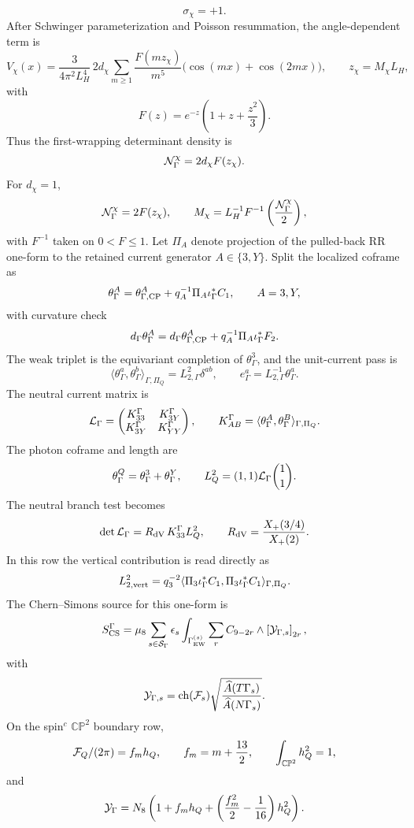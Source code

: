 \documentclass[11pt]{article}
\theoremstyle{definition}
\theoremstyle{remark}
\newcommand{\CP}{\mathbb{CP}}
\newcommand{\Xp}{X_+}
\begin{document}
\[
  \sigma_\chi=+1.
\]
After Schwinger parameterization and Poisson resummation, the
angle-dependent term is
\[
  V_\chi(x)
  =
  \frac{3}{4\pi^2L_H^4}\,2d_\chi
  \sum_{m\ge1}
  \frac{F(mz_\chi)}{m^5}
  \bigl(\cos(mx)+\cos(2mx)\bigr),
  \qquad
  z_\chi=M_\chi L_H ,
\]
with
\[
  F(z)=e^{-z}\left(1+z+\frac{z^2}{3}\right).
\]
Thus the first-wrapping determinant density is
\[
  {\cal N}_\Gamma^\chi=2d_\chi F(z_\chi).
\]
For \(d_\chi=1\),
\[
  {\cal N}_\Gamma^\chi=2F(z_\chi),
  \qquad
  M_\chi=L_H^{-1}F^{-1}
  \left(\frac{{\cal N}_\Gamma^\chi}{2}\right),
\]
with \(F^{-1}\) taken on \(0<F\le1\).
Let \(\Pi_A\) denote projection of the pulled-back RR one-form to the retained
current generator \(A\in\{3,Y\}\).  Split the localized coframe as
\[
  \theta_\Gamma^A
  =
  \theta_{\Gamma,{\rm CP}}^A
  +
  q_A^{-1}\Pi_A\iota_\Gamma^*C_1,
  \qquad A=3,Y,
\]
with curvature check
\[
  d_\Gamma\theta_\Gamma^A
  =
  d_\Gamma\theta_{\Gamma,{\rm CP}}^A
  +
  q_A^{-1}\Pi_A\iota_\Gamma^*F_2 .
\]
The weak triplet is the equivariant completion of \(\theta_\Gamma^3\), and
the unit-current pass is
\[
  \langle\theta_\Gamma^a,\theta_\Gamma^b\rangle_{\Gamma,\Pi_Q}
  =
  L_{2,\Gamma}^2\delta^{ab},
  \qquad
  e_\Gamma^a=L_{2,\Gamma}^{-1}\theta_\Gamma^a .
\]
The neutral current matrix is
\[
  {\cal L}_\Gamma
  =
  \begin{pmatrix}
  K_{33}^\Gamma&K_{3Y}^\Gamma\\
  K_{3Y}^\Gamma&K_{YY}^\Gamma
  \end{pmatrix},
  \qquad
  K_{AB}^\Gamma
  =
  \langle\theta_\Gamma^A,\theta_\Gamma^B\rangle_{\Gamma,\Pi_Q}.
\]
The photon coframe and length are
\[
  \theta_\Gamma^Q=\theta_\Gamma^3+\theta_\Gamma^Y,
  \qquad
  L_Q^2=(1,1){\cal L}_\Gamma\binom{1}{1}.
\]
The neutral branch test becomes
\[
  \det{\cal L}_\Gamma
  =
  R_{\rm dV}\,K_{33}^\Gamma L_Q^2,
  \qquad
  R_{\rm dV}=\frac{\Xp(3/4)}{\Xp(2)}.
\]
In this row the vertical contribution is read directly as
\[
  L_{2,{\rm vert}}^2
  =
  q_3^{-2}
  \langle\Pi_3\iota_\Gamma^*C_1,
  \Pi_3\iota_\Gamma^*C_1\rangle_{\Gamma,\Pi_Q}.
\]
The Chern--Simons source for this one-form is
\[
  S_{\rm CS}^{\Gamma}
  =
  \mu_8\sum_{s\in{\cal S}_\Gamma}\epsilon_s
  \int_{\Gamma_{\rm EW}^{(s)}}
  \sum_r C_{9-2r}\wedge
  \left[{\cal Y}_{\Gamma,s}\right]_{2r},
\]
with
\[
  {\cal Y}_{\Gamma,s}
  =
  {\rm ch}({\cal F}_s)
  \sqrt{\frac{\widehat A(T\Gamma_s)}{\widehat A(N\Gamma_s)}} .
\]
On the spin\(^c\) \(\CP^2\) boundary row,
\[
  {\cal F}_Q/(2\pi)=f_mh_Q,
  \qquad
  f_m=m+\frac{13}{2},
  \qquad
  \int_{\CP^2}h_Q^2=1,
\]
and
\[
  {\cal Y}_{\Gamma}
  =
  N_8\left(
  1+f_mh_Q+
  \left(\frac{f_m^2}{2}-\frac{1}{16}\right)h_Q^2
  \right).
\]
\end{document}
